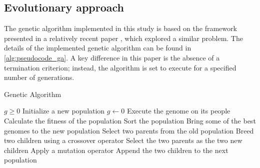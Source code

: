 

\subsection{Evolutionary approach}

    The genetic algorithm implemented in this study is based on the framework presented in a relatively recent paper \cite{tartan2016flow}, which explored a similar problem. The details of the implemented genetic algorithm can be found in \ref{alg:pseudocode_ga}. A key difference in this paper is the absence of a termination criterion; instead, the algorithm is set to execute for a specified number of generations.

    \begin{algorithm}
        \caption{Genetic Algorithm}\label{alg:pseudocode_ga}
        \begin{algorithmic}
        \Require $g \geq 0$
        \State Initialize a new population
        \State $g \gets 0$
                \State Execute the genome on its people
            \EndFor
            \State Calculate the fitness of the population
            \State Sort the population
             
                \State Bring some of the best genomes to the new population
            \EndIf
                \State Select two parents from the old population
                    \State Breed two children using a crossover operator
                \Else
                    \State Select the two parents as the two new children
                \EndIf
                        \State Apply a mutation operator
                    \EndIf
                \EndFor
                \State Append the two children to the next population
            \EndWhile
        \EndWhile
        \end{algorithmic}
    \end{algorithm}

